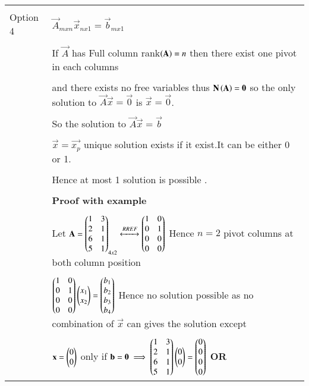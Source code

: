 \begin{longtable}{|l|l|}
&\\
Option 4
&$\vec{A}_{mxn}\vec{x}_{nx1}=\vec{b}_{mx1}$\\
&\\
&If $\vec{A}$ has Full column rank$\left(\mathbf{A}\right)=n$ then there exist one pivot in each columns \\
&\\
&and there exists no free variables thus $\mathbf{N\left(A\right)}=\mathbf{0}$ so the only solution to $\vec{A}\vec{x}=\vec{0}$ is $\vec{x}=\vec{0}$.\\ 
&\\
&So the solution to $\vec{A}\vec{x}=\vec{b}$\\
&\\
&$\vec{x}=\vec{x_p}$ unique solution exists if it exist.It can be either 0 or 1.\\
&\\
&Hence at most 1 solution is possible .\\
&\\
&\textbf{Proof with example}\\
&\\
&Let $\mathbf{A}=\begin{pmatrix}1&3\\2&1\\6&1\\5&1\end{pmatrix}_{4x2}\xleftrightarrow{RREF}\begin{pmatrix}1&0\\0&1\\0&0\\0&0\end{pmatrix}$ Hence $n=2$ pivot columns at both column position \\ 
&\\
&$\begin{pmatrix}1&0\\0&1\\0&0\\0&0\end{pmatrix}\begin{pmatrix}x_1\\x_2\end{pmatrix}=\begin{pmatrix}b_1\\b_2\\b_3\\b_4\end{pmatrix}$ Hence no solution possible  as no combination of $\vec{x}$ can gives the solution except\\
&\\
&$\mathbf{x}=\begin{pmatrix}0\\0\end{pmatrix}$ only if $\mathbf{b}=\mathbf{0} \implies \begin{pmatrix}1&3\\2&1\\6&1\\5&1\end{pmatrix}\begin{pmatrix}0\\0\end{pmatrix}=\begin{pmatrix}0\\0\\0\\0\end{pmatrix}$ \textbf{OR}\\

\end{longtable}
